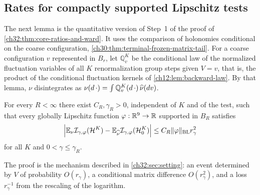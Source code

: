 \subsection{Rates for compactly supported Lipschitz tests}

The next lemma is the quantitative version of Step~1 of the proof of \cref{ch32:thm:core-ratios-and-ward}. It uses the comparison of holonomies conditional on the coarse configuration, \cref{ch30:thm:terminal-frozen-matrix-tail}. For a coarse configuration $v$ represented in $B_r$, let $\mathbb Q^K_v$ be the conditional law of the normalized fluctuation variables of all $K$ renormalization group steps given $V=v$, that is, the product of the conditional fluctuation kernels of \cref{ch12:lem:backward-law}. By that lemma, $\nu$ disintegrates as $\nu(d\,\cdot)=\int\mathbb Q^K_v(d\,\cdot)\,\widehat\nu(dv)$.

\begin{lemma}\label{ch32:lem:quantitative-rare-transfer}
For every $R<\infty$ there exist $C_R,\gamma_R>0$, independent of $K$ and of the test, such that every globally Lipschitz function $\varphi:\mathbb R^9\to\mathbb R$ supported in $B_R$ satisfies
\begin{equation}\label{ch32:eq:quantitative-rare-transfer}
 \Bigl\lvert\mathbb E_\nu\mathcal I_{\gamma,\varphi}(\mathcal H^K)-\mathbb E_{\widehat\nu}\mathcal I_{\gamma,\varphi}(\mathcal H^K_0)\Bigr\rvert\le C_R\lVert \varphi\rVert_{\mathrm{BL}}r_\gamma^2
\end{equation}
for all $K$ and $0<\gamma\le\gamma_R$.
\end{lemma}

The proof is the mechanism described in \cref{ch32:sec:setting}: an event determined by $V$ of probability $O(r_\gamma)$, a conditional matrix difference $O(r_\gamma^2)$, and a loss $r_\gamma^{-1}$ from the rescaling of the logarithm.


